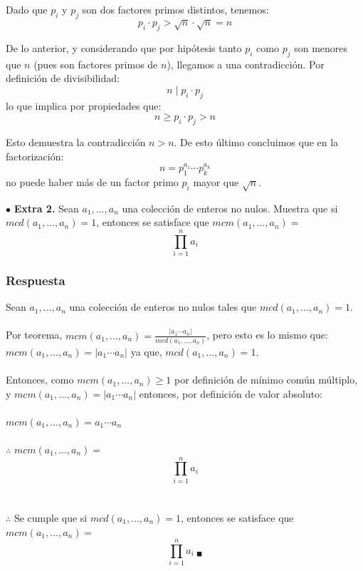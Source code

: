 \documentclass[12pt]{article}
\begin{document}
	Dado que $p_i$ y $p_j$ son dos factores primos distintos, tenemos:
	\[ p_i \cdot p_j > \sqrt{n} \cdot \sqrt{n} = n \]
	
	De lo anterior, y considerando que por hipótesis tanto $p_i$ como $p_j$ son menores que $n$ (pues son factores primos de $n$), llegamos a una contradicción. Por definición de divisibilidad:
	\[ n \mid p_i \cdot p_j \]
	lo que implica por propiedades que:
	\[ n \geq p_i \cdot p_j > n \]
	
	Esto demuestra la contradicción $n > n$. De esto último concluimos que en la factorización:
	\[ n = p_1^{a_1} \cdots p_k^{a_k} \]
	no puede haber más de un factor primo $p_i$ mayor que $\sqrt{n}$.
	
	\vspace{1cm}
	
	$\bullet$ \textbf{Extra 2.} Sean $a_1,..., a_n$ una colección de enteros no nulos. Muestra que si $mcd(a_1,..., a_n)=1$, entonces se satisface que $mcm(a_1,..., a_n)=$ \[\prod_{i=1}^{n} a_i\]
	
	\subsubsection*{Respuesta}
	Sean $a_1,..., a_n$ una colección de enteros no nulos tales que $mcd(a_1,..., a_n)=1$. \\\\
	Por teorema, $mcm(a_1,..., a_n)=\frac{|a_1 \cdots a_n|}{mcd(a_1,..., a_n)}$, pero esto es lo mismo que: $mcm(a_1,..., a_n)=|a_1 \cdots a_n|$ ya que, $mcd(a_1,..., a_n)=1$.\\\\
	Entonces, como $mcm(a_1,..., a_n)\ge1$ por definición de mínimo común múltiplo, y $mcm(a_1,..., a_n)=|a_1 \cdots a_n|$ entonces, por definición de valor absoluto:\\\\
	$mcm(a_1,..., a_n)=a_1 \cdots a_n$\\\\
	$\therefore$ $mcm(a_1,..., a_n)=$\[\prod_{i=1}^{n} a_i\]\\\\
	$\therefore$ Se cumple que si $mcd(a_1,..., a_n)=1$, entonces se satisface que $mcm(a_1,..., a_n)=$ \[\prod_{i=1}^{n} a_i \ _\blacksquare \] 
	
\end{document}
